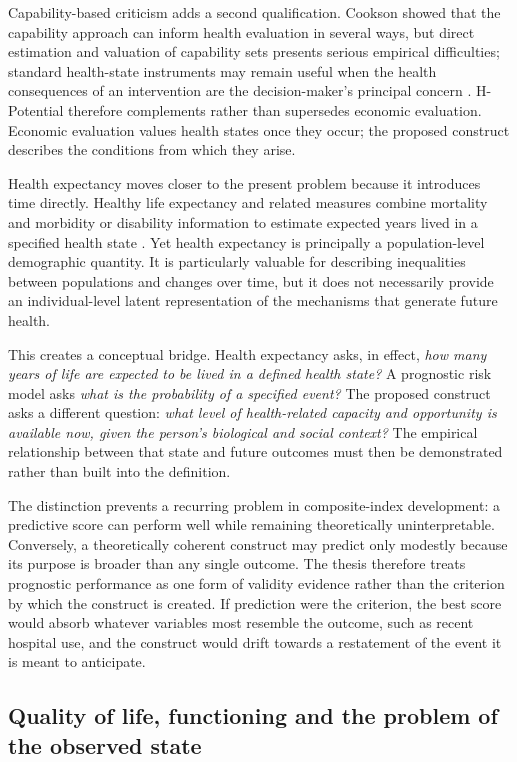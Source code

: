 Capability-based criticism adds a second qualification. Cookson showed that the
capability approach can inform health evaluation in several ways, but direct
estimation and valuation of capability sets presents serious empirical
difficulties; standard health-state instruments may remain useful when the
health consequences of an intervention are the decision-maker's principal
concern \citep{cookson_2005}. H-Potential therefore complements rather than
supersedes economic evaluation. Economic evaluation values health states once they
occur; the proposed construct describes the conditions from which they arise.

Health expectancy moves closer to the present problem because it introduces time directly. Healthy life expectancy and related measures combine mortality and morbidity or disability information to estimate expected years lived in a specified health state \citep{who_hale_2019}. Yet health expectancy is principally a population-level demographic quantity. It is particularly valuable for describing inequalities between populations and changes over time, but it does not necessarily provide an individual-level latent representation of the mechanisms that generate future health.

This creates a conceptual bridge. Health expectancy asks, in effect, \emph{how many years of life are expected to be lived in a defined health state?} A prognostic risk model asks \emph{what is the probability of a specified event?} The proposed construct asks a different question: \emph{what level of health-related capacity and opportunity is available now, given the person's biological and social context?} The empirical relationship between that state and future outcomes must then be demonstrated rather than built into the definition.

The distinction prevents a recurring problem in composite-index development: a predictive score can perform well while remaining theoretically uninterpretable. Conversely, a theoretically coherent construct may predict only modestly because its purpose is broader than any single outcome. The thesis therefore treats prognostic performance as one form of validity evidence rather than the criterion by which the construct is created. If prediction were the criterion, the best score would absorb whatever variables most resemble the outcome, such as recent hospital use, and the construct would drift towards a restatement of the event it is meant to anticipate.

\subsection{Quality of life, functioning and the problem of the observed state}

